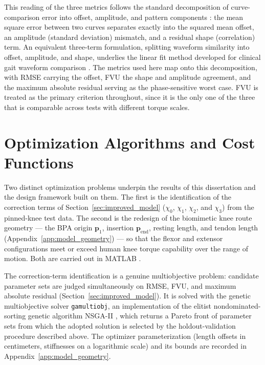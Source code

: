 This reading of the three metrics follows the standard decomposition of curve-comparison error into offset, amplitude, and pattern components \citep{taylor_summarizing_2001}: the mean square error between two curves separates exactly into the squared mean offset, an amplitude (standard deviation) mismatch, and a residual shape (correlation) term. An equivalent three-term formulation, splitting waveform similarity into offset, amplitude, and shape, underlies the linear fit method developed for clinical gait waveform comparison \citep{iosa_assessment_2014}. The metrics used here map onto this decomposition, with RMSE carrying the offset, FVU the shape and amplitude agreement, and the maximum absolute residual serving as the phase-sensitive worst case. FVU is treated as the primary criterion throughout, since it is the only one of the three that is comparable across tests with different torque scales.

\section{Optimization Algorithms and Cost Functions}\label{sec:optimization}

Two distinct optimization problems underpin the results of this dissertation and the design framework built on them. The first is the identification of the correction terms of Section~\ref{sec:improved_model} ($\chi_{0}$, $\chi_{1}$, $\chi_{2}$, and $\chi_{3}$) from the pinned-knee test data. The second is the redesign of the biomimetic knee route geometry --- the BPA origin $\mathbf{p}_{1}$, insertion $\mathbf{p}_{\text{end}}$, resting length, and tendon length (Appendix~\ref{app:model_geometry}) --- so that the flexor and extensor configurations meet or exceed human knee torque capability over the range of motion. Both are carried out in MATLAB \citep{mathworks_optimization_2025}.

The correction-term identification is a genuine multiobjective problem: candidate parameter sets are judged simultaneously on RMSE, FVU, and maximum absolute residual (Section~\ref{sec:improved_model}). It is solved with the genetic multiobjective solver \texttt{gamultiobj}, an implementation of the elitist nondominated-sorting genetic algorithm NSGA-II \citep{deb_nsga2_2002, mathworks_optimization_2025}, which returns a Pareto front of parameter sets from which the adopted solution is selected by the holdout-validation procedure described above. The optimizer parameterization (length offsets in centimeters, stiffnesses on a logarithmic scale) and its bounds are recorded in Appendix~\ref{app:model_geometry}.

